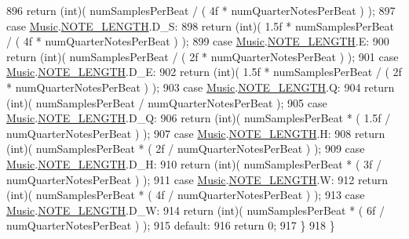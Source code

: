 \begin{DoxyCode}
896                 \textcolor{keywordflow}{return} (\textcolor{keywordtype}{int})( numSamplesPerBeat / ( 4f * numQuarterNotesPerBeat ) );
897             \textcolor{keywordflow}{case} \hyperlink{class_music}{Music}.\hyperlink{group___music_enums_gaf11b5f079adbb21c800b9eca1c5c3cbd}{NOTE\_LENGTH}.D\_S:
898                 \textcolor{keywordflow}{return} (\textcolor{keywordtype}{int})( 1.5f * numSamplesPerBeat / ( 4f * numQuarterNotesPerBeat ) );
899             \textcolor{keywordflow}{case} \hyperlink{class_music}{Music}.\hyperlink{group___music_enums_gaf11b5f079adbb21c800b9eca1c5c3cbd}{NOTE\_LENGTH}.E:
900                 \textcolor{keywordflow}{return} (\textcolor{keywordtype}{int})( numSamplesPerBeat / ( 2f * numQuarterNotesPerBeat ) );
901             \textcolor{keywordflow}{case} \hyperlink{class_music}{Music}.\hyperlink{group___music_enums_gaf11b5f079adbb21c800b9eca1c5c3cbd}{NOTE\_LENGTH}.D\_E:
902                 \textcolor{keywordflow}{return} (\textcolor{keywordtype}{int})( 1.5f * numSamplesPerBeat / ( 2f * numQuarterNotesPerBeat ) );
903             \textcolor{keywordflow}{case} \hyperlink{class_music}{Music}.\hyperlink{group___music_enums_gaf11b5f079adbb21c800b9eca1c5c3cbd}{NOTE\_LENGTH}.Q:
904                 \textcolor{keywordflow}{return} (\textcolor{keywordtype}{int})( numSamplesPerBeat / numQuarterNotesPerBeat );
905             \textcolor{keywordflow}{case} \hyperlink{class_music}{Music}.\hyperlink{group___music_enums_gaf11b5f079adbb21c800b9eca1c5c3cbd}{NOTE\_LENGTH}.D\_Q:
906                 \textcolor{keywordflow}{return} (\textcolor{keywordtype}{int})( numSamplesPerBeat * ( 1.5f / numQuarterNotesPerBeat ) );
907             \textcolor{keywordflow}{case} \hyperlink{class_music}{Music}.\hyperlink{group___music_enums_gaf11b5f079adbb21c800b9eca1c5c3cbd}{NOTE\_LENGTH}.H:
908                 \textcolor{keywordflow}{return} (\textcolor{keywordtype}{int})( numSamplesPerBeat * ( 2f / numQuarterNotesPerBeat ) );
909             \textcolor{keywordflow}{case} \hyperlink{class_music}{Music}.\hyperlink{group___music_enums_gaf11b5f079adbb21c800b9eca1c5c3cbd}{NOTE\_LENGTH}.D\_H:
910                 \textcolor{keywordflow}{return} (\textcolor{keywordtype}{int})( numSamplesPerBeat * ( 3f / numQuarterNotesPerBeat ) );
911             \textcolor{keywordflow}{case} \hyperlink{class_music}{Music}.\hyperlink{group___music_enums_gaf11b5f079adbb21c800b9eca1c5c3cbd}{NOTE\_LENGTH}.W:
912                 \textcolor{keywordflow}{return} (\textcolor{keywordtype}{int})( numSamplesPerBeat * ( 4f / numQuarterNotesPerBeat ) );
913             \textcolor{keywordflow}{case} \hyperlink{class_music}{Music}.\hyperlink{group___music_enums_gaf11b5f079adbb21c800b9eca1c5c3cbd}{NOTE\_LENGTH}.D\_W:
914                 \textcolor{keywordflow}{return} (\textcolor{keywordtype}{int})( numSamplesPerBeat * ( 6f / numQuarterNotesPerBeat ) );
915             \textcolor{keywordflow}{default}:
916                 \textcolor{keywordflow}{return} 0;
917         \}
918     \}
\end{DoxyCode}
